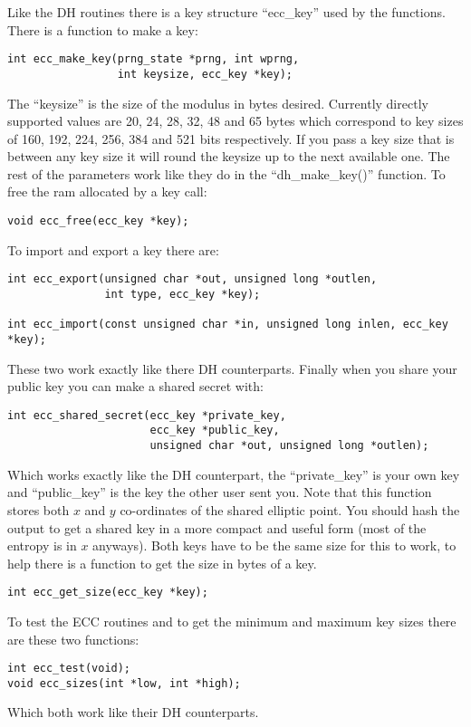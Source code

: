 \documentclass{book}
\begin{document}
Like the DH routines there is a key structure ``ecc\_key'' used by the functions.  There is a function to make a key:
\begin{verbatim}
int ecc_make_key(prng_state *prng, int wprng, 
                 int keysize, ecc_key *key);
\end{verbatim}

The ``keysize'' is the size of the modulus in bytes desired.  Currently directly supported values are 20, 24, 28, 32, 48 and 65 bytes which
correspond to key sizes of 160, 192, 224, 256, 384 and 521 bits respectively.  If you pass a key size that is between any key size
it will round the keysize up to the next available one.  The rest of the parameters work like they do in the ``dh\_make\_key()'' function.  
To free the ram allocated by a key call:
\begin{verbatim}
void ecc_free(ecc_key *key);
\end{verbatim}

To import and export a key there are: 
\begin{verbatim}
int ecc_export(unsigned char *out, unsigned long *outlen, 
               int type, ecc_key *key);

int ecc_import(const unsigned char *in, unsigned long inlen, ecc_key *key);
\end{verbatim}
These two work exactly like there DH counterparts.  Finally when you share your public key you can make a shared secret
with:
\begin{verbatim}
int ecc_shared_secret(ecc_key *private_key, 
                      ecc_key *public_key, 
                      unsigned char *out, unsigned long *outlen);
\end{verbatim}
Which works exactly like the DH counterpart, the ``private\_key'' is your own key and ``public\_key'' is the key the other
user sent you.   Note that this function stores both $x$ and $y$ co-ordinates of the shared
elliptic point.  You should hash the output to get a shared key in a more compact and useful form (most of the entropy is 
in $x$ anyways).  Both keys have to be the same size for this to work, to help there is a function to get the size in bytes
 of a key.
\begin{verbatim}
int ecc_get_size(ecc_key *key);
\end{verbatim}

To test the ECC routines and to get the minimum and maximum key sizes there are these two functions:
\begin{verbatim}
int ecc_test(void);
void ecc_sizes(int *low, int *high);
\end{verbatim}
Which both work like their DH counterparts.
\end{document}
